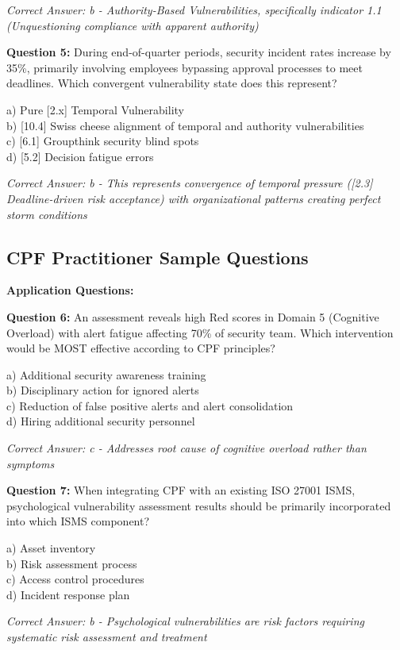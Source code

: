 \documentclass[11pt,a4paper]{article}
\begin{document}
\textit{Correct Answer: b - Authority-Based Vulnerabilities, specifically indicator 1.1 (Unquestioning compliance with apparent authority)}

\textbf{Question 5:} During end-of-quarter periods, security incident rates increase by 35\%, primarily involving employees bypassing approval processes to meet deadlines. Which convergent vulnerability state does this represent?

a) Pure [2.x] Temporal Vulnerability\\
b) [10.4] Swiss cheese alignment of temporal and authority vulnerabilities\\
c) [6.1] Groupthink security blind spots\\
d) [5.2] Decision fatigue errors

\textit{Correct Answer: b - This represents convergence of temporal pressure ([2.3] Deadline-driven risk acceptance) with organizational patterns creating perfect storm conditions}

\subsection{CPF Practitioner Sample Questions}

\textbf{Application Questions:}

\textbf{Question 6:} An assessment reveals high Red scores in Domain 5 (Cognitive Overload) with alert fatigue affecting 70\% of security team. Which intervention would be MOST effective according to CPF principles?

a) Additional security awareness training\\
b) Disciplinary action for ignored alerts\\
c) Reduction of false positive alerts and alert consolidation\\
d) Hiring additional security personnel

\textit{Correct Answer: c - Addresses root cause of cognitive overload rather than symptoms}

\textbf{Question 7:} When integrating CPF with an existing ISO 27001 ISMS, psychological vulnerability assessment results should be primarily incorporated into which ISMS component?

a) Asset inventory\\
b) Risk assessment process\\
c) Access control procedures\\
d) Incident response plan

\textit{Correct Answer: b - Psychological vulnerabilities are risk factors requiring systematic risk assessment and treatment}
\end{document}
